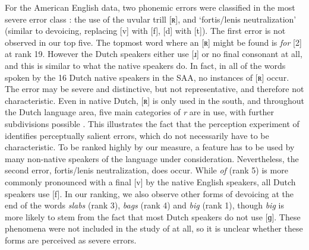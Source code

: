 \documentclass[output=paper]{LSP/langsci}
\begin{document}
For the American English data, two phonemic errors were classified in the most severe error class \citet{van_den_doel_evaluation_2006}: the use of the uvular trill [ʀ], and `fortis/lenis neutralization' (similar to devoicing, replacing [v] with [f], [d] with [t]).
The first error is not observed in our top five. The topmost word where an [ʀ] might be found is \textit{for} [2] at rank 19. However the Dutch speakers either use [ɹ] or no final consonant at all, and this is similar to what the native speakers do. In fact, in all of the words spoken by the 16 Dutch native speakers in the SAA, no instances of [ʀ] occur. The error may be severe and distinctive, but not representative, and therefore not characteristic. Even in native Dutch, [ʀ] is only used in the south, and throughout the Dutch language area, five main categories of \textit{r} are in use, with further subdivisions possible \citep{sebregts_sociophonetics_2015}. 
This illustrates the fact that the perception experiment of \citet{van_den_doel_evaluation_2006} identifies perceptually salient errors, which do not necessarily have to be characteristic. To be ranked highly by our measure, a feature has to be used by many non-native speakers of the language under consideration. Nevertheless, the second error, fortis/lenis neutralization, does occur. While \textit{of} (rank 5) is more commonly pronounced with a final [v] by the native English speakers, all Dutch speakers use [f]. In our ranking, we also observe other forms of devoicing at the end of the words \textit{slabs} (rank 3), \textit{bags} (rank 4) and \textit{big} (rank 1), though \textit{big} is more likely to stem from the fact that most Dutch speakers do not use [ɡ]. These phenomena were not included in the study of \citet{van_den_doel_evaluation_2006} at all, so it is unclear whether these forms are perceived as severe errors.
\end{document}
